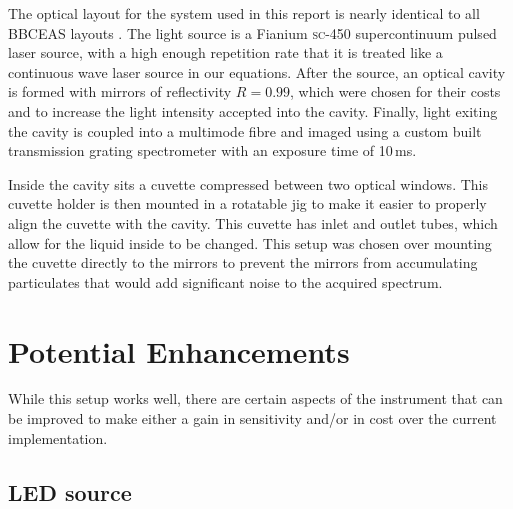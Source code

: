 
The optical layout for the system used in this report is nearly identical to
all \ac{BBCEAS} layouts \cite{Berden:2009wk}. The light source is a Fianium
\textsc{sc-450} supercontinuum pulsed laser source, with a high enough
repetition rate that it is treated like a continuous wave laser source in
our equations. After the source, an optical cavity is formed with mirrors of
reflectivity $R=0.99$, which were chosen for their costs and to increase the
light intensity accepted into the cavity. Finally, light exiting the cavity is
coupled into a multimode fibre and imaged using a custom built transmission
grating spectrometer with an exposure time of 10\,ms.


Inside the cavity sits a cuvette compressed between two optical windows. This
cuvette holder is then mounted in a rotatable jig to make it easier to properly
align the cuvette with the cavity. This cuvette has inlet and outlet tubes,
which allow for the liquid inside to be changed. This setup was chosen over
mounting the cuvette directly to the mirrors \cite{Seetohul:2009ij} to prevent
the mirrors from accumulating particulates that would add significant noise to
the acquired spectrum.



\section{Potential Enhancements}\label{sec:bbceas_enhance}

While this setup works well, there are certain aspects of the instrument that
can be improved to make either a gain in sensitivity and/or in cost over the
current implementation.

\subsection{LED source}\label{sec:bbceas_led}


